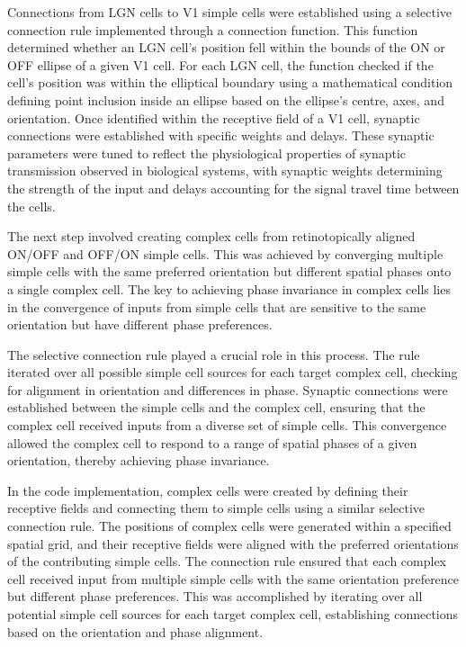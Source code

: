 \documentclass[12pt]{article}
\begin{document}
Connections from LGN cells to V1 simple cells were established using a selective connection rule implemented through a connection function. This function determined whether an LGN cell's position fell within the bounds of the ON or OFF ellipse of a given V1 cell. For each LGN cell, the function checked if the cell's position was within the elliptical boundary using a mathematical condition defining point inclusion inside an ellipse based on the ellipse's centre, axes, and orientation. Once identified within the receptive field of a V1 cell, synaptic connections were established with specific weights and delays. These synaptic parameters were tuned to reflect the physiological properties of synaptic transmission observed in biological systems, with synaptic weights determining the strength of the input and delays accounting for the signal travel time between the cells.

 The next step involved creating complex cells from retinotopically aligned ON/OFF and OFF/ON simple cells. This was achieved by converging multiple simple cells with the same preferred orientation but different spatial phases onto a single complex cell. The key to achieving phase invariance in complex cells lies in the convergence of inputs from simple cells that are sensitive to the same orientation but have different phase preferences.

The selective connection rule played a crucial role in this process. The rule iterated over all possible simple cell sources for each target complex cell, checking for alignment in orientation and differences in phase. Synaptic connections were established between the simple cells and the complex cell, ensuring that the complex cell received inputs from a diverse set of simple cells. This convergence allowed the complex cell to respond to a range of spatial phases of a given orientation, thereby achieving phase invariance.

In the code implementation, complex cells were created by defining their receptive fields and connecting them to simple cells using a similar selective connection rule. The positions of complex cells were generated within a specified spatial grid, and their receptive fields were aligned with the preferred orientations of the contributing simple cells. The connection rule ensured that each complex cell received input from multiple simple cells with the same orientation preference but different phase preferences. This was accomplished by iterating over all potential simple cell sources for each target complex cell, establishing connections based on the orientation and phase alignment.
\end{document}
